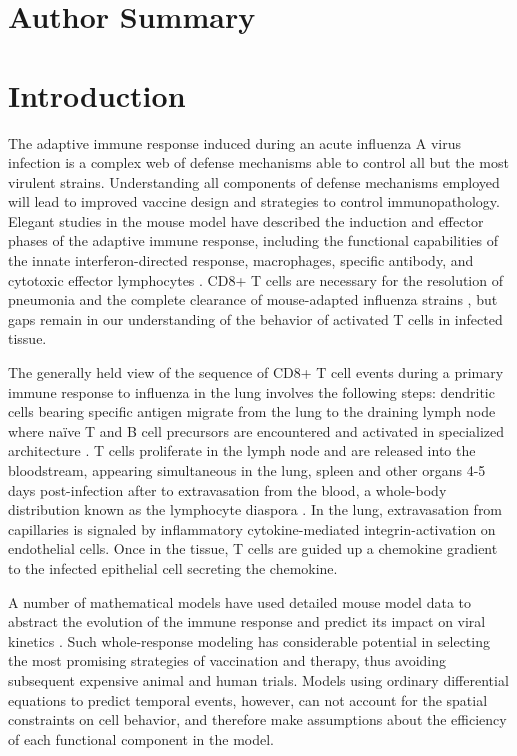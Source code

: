 \documentclass[10pt]{article}
\begin{document}
\section*{Author Summary}


\section*{Introduction}

The adaptive immune response induced during an acute influenza A virus infection is a complex web of defense mechanisms able to control all but the most virulent strains.  Understanding all components of defense mechanisms employed will lead to improved vaccine design and strategies to control immunopathology. Elegant studies in the mouse model have described the induction and effector phases of the adaptive immune response, including the functional capabilities of the innate interferon-directed response, macrophages, specific antibody, and cytotoxic effector lymphocytes \cite{Sallusto2000, Joo2008, Mackay2008}.   CD8+ T cells are necessary for the resolution of pneumonia and the complete clearance of mouse-adapted influenza strains \cite{Sallusto2000, Joo2008, Mackay2008, Miao2010}, but gaps remain in our understanding of the behavior of activated T cells in infected tissue.

The generally held view of the sequence of CD8+ T cell events during a primary immune response to influenza in the lung involves the following steps: dendritic cells bearing specific antigen migrate from the lung to the draining lymph node where naïve T and B cell precursors are encountered and activated in specialized architecture \cite{Saenz2010, Beltman2007, Handel2008, Zheng2008, Ingulli2009, Allan1990}.  T cells proliferate in the lymph node and are released into the bloodstream, appearing simultaneous in the lung, spleen and other organs 4-5 days post-infection after to extravasation from the blood, a whole-body distribution known as the lymphocyte diaspora \cite{Thelen2008}.  In the lung, extravasation from capillaries is signaled by inflammatory cytokine-mediated integrin-activation on endothelial cells.  Once in the tissue, T cells are guided up a chemokine gradient to the infected epithelial cell secreting the chemokine.

A number of mathematical models have used detailed mouse model data to abstract the evolution of the immune response and predict its impact on viral kinetics \cite{Thomas-Vaslin2008, Beauchemin2008, Smith2010, Thakar2010, Burrowes2004}.  Such whole-response modeling has considerable potential in selecting the most promising strategies of vaccination and therapy, thus avoiding subsequent expensive animal and human trials.  Models using ordinary differential equations to predict temporal events, however, can not account for the spatial constraints on cell behavior, and therefore make assumptions about the efficiency of each functional component in the model. 
\end{document}
